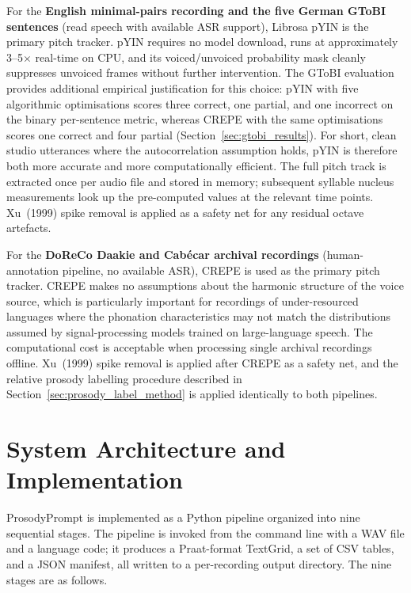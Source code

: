 For the \textbf{English minimal-pairs recording and the five German GToBI
sentences} (read speech with available ASR support), Librosa pYIN is the primary
pitch tracker. pYIN requires no model download, runs at approximately
3--5$\times$ real-time on CPU, and its voiced/unvoiced probability mask cleanly
suppresses unvoiced frames without further intervention. The GToBI evaluation
provides additional empirical justification for this choice: pYIN with five
algorithmic optimisations scores three correct, one partial, and one incorrect
on the binary per-sentence metric, whereas CREPE with the same optimisations
scores one correct and four partial (Section~\ref{sec:gtobi_results}). For
short, clean studio utterances where the autocorrelation assumption holds,
pYIN is therefore both more accurate and more computationally efficient.
The full pitch track is extracted once per audio file and stored in memory;
subsequent syllable nucleus measurements look up the pre-computed values at
the relevant time points. Xu~(1999) spike removal is applied as a safety net
for any residual octave artefacts.

For the \textbf{DoReCo Daakie and Cabécar archival recordings}
(human-annotation pipeline, no available ASR), CREPE is used as the primary
pitch tracker. CREPE makes no assumptions about the harmonic structure of the
voice source, which is particularly important for recordings of
under-resourced languages where the phonation characteristics may not match
the distributions assumed by signal-processing models trained on large-language
speech. The computational cost is acceptable when processing single archival
recordings offline. Xu~(1999) spike removal is applied after CREPE as a safety
net, and the relative prosody labelling procedure described in
Section~\ref{sec:prosody_label_method} is applied identically to both
pipelines.


\section{System Architecture and Implementation}
\label{sec:implementation}

ProsodyPrompt is implemented as a Python pipeline organized into nine sequential
stages. The pipeline is invoked from the command line with a WAV file and a
language code; it produces a Praat-format TextGrid, a set of CSV tables, and a
JSON manifest, all written to a per-recording output directory. The nine stages
are as follows.


